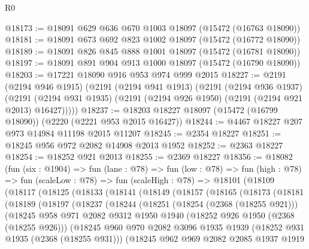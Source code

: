 \begin{lexlean}{R0}
\begin{coremodule}
@18173 := @18091 @629 @636 @670 @1003 @18097 (@15472 (@16763 @18090))
@18181 := @18091 @673 @692 @823 @1002 @18097 (@15472 (@16772 @18090))
@18189 := @18091 @826 @845 @888 @1001 @18097 (@15472 (@16781 @18090))
@18197 := @18091 @891 @904 @913 @1000 @18097 (@15472 (@16790 @18090))
@18203 := @17221 @18090 @916 @953 @974 @999 @2015
@18227 := @2191
    (@2194 @946 @1915)
    (@2191
      (@2194 @941 @1913)
      (@2191
        (@2194 @936 @1937)
        (@2191 (@2194 @931 @1935) (@2191 (@2194 @926 @1950) (@2191 (@2194 @921 @2013) @16427)))))
@18237 := @18203 @18227 @18097 (@15472 (@16799 @18090)) (@2220 (@2221 @953 @2015 @16427))
@18244 := @4467 @18227 @207 @973 @14984 @11198 @2015 @11207
@18245 := @2354 @18227
@18251 := @18245 @956 @972 @2082 @14908 @2013 @1952
@18252 := @2363 @18227
@18254 := @18252 @921 @2013
@18255 := @2369 @18227
@18356 := @18082
    (fun (six : @1904) =>
    fun (lane : @78) =>
    fun (low : @78) =>
    fun (high : @78) =>
    fun (scaleLow : @78) =>
    fun (scaleHigh : @78) =>
    @18101
      (@18109
        (@18117
          (@18125
            (@18133
              (@18141
                (@18149
                  (@18157
                    (@18165
                      (@18173
                        (@18181
                          (@18189
                            (@18197
                              (@18237
                                (@18244
                                  (@18251
                                    (@18254 (@2368 (@18255 @921)))
                                    (@18245
                                      @958
                                      @971
                                      @2082
                                      @9312
                                      @1950
                                      @1940
                                      (@18252 @926 @1950 (@2368 (@18255 @926)))
                                      (@18245
                                        @960
                                        @970
                                        @2082
                                        @3096
                                        @1935
                                        @1939
                                        (@18252 @931 @1935 (@2368 (@18255 @931)))
                                        (@18245
                                          @962
                                          @969
                                          @2082
                                          @2085
                                          @1937
                                          @1919

\end{coremodule}
\end{lexlean}
